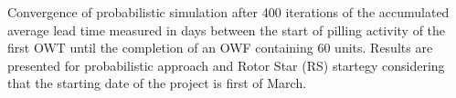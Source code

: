 \label{fig:convergence}
Convergence of probabilistic simulation after 400 iterations of the accumulated average lead time measured in days between the start of pilling activity of the first OWT until the completion of an OWF containing 60 units. Results are presented for probabilistic approach and Rotor Star (RS) startegy considering that the starting date of the project is first of March.